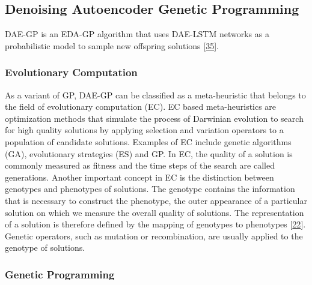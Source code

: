 \documentclass[
  11pt,
]{article}
\begin{document}
\hypertarget{denoising-autoencoder-genetic-programming}{%
\subsection{Denoising Autoencoder Genetic Programming}\label{denoising-autoencoder-genetic-programming}}

DAE-GP is an EDA-GP algorithm that uses DAE-LSTM networks as a probabilistic model to sample new offspring solutions {[}\protect\hyperlink{ref-dae-gp_2020_rtree}{35}{]}.

\hypertarget{evolutionary-computation}{%
\subsubsection{Evolutionary Computation}\label{evolutionary-computation}}

As a variant of GP, DAE-GP can be classified as a meta-heuristic that belongs to the field of evolutionary computation (EC).
EC based meta-heuristics are optimization methods that simulate the process of Darwinian evolution to search for high quality solutions by applying selection and variation operators to a population of candidate solutions.
Examples of EC include genetic algorithms (GA), evolutionary strategies (ES) and GP.
In EC, the quality of a solution is commonly measured as fitness and the time steps of the search are called generations.
Another important concept in EC is the distinction between genotypes and phenotypes of solutions.
The genotype contains the information that is necessary to construct the phenotype, the outer appearance of a particular solution on which we measure the overall quality of solutions.
The representation of a solution is therefore defined by the mapping of genotypes to phenotypes {[}\protect\hyperlink{ref-design_of_modern_heuristics}{22}{]}.
Genetic operators, such as mutation or recombination, are usually applied to the genotype of solutions.

\hypertarget{genetic-programming}{%
\subsubsection{Genetic Programming}\label{genetic-programming}}
\end{document}
